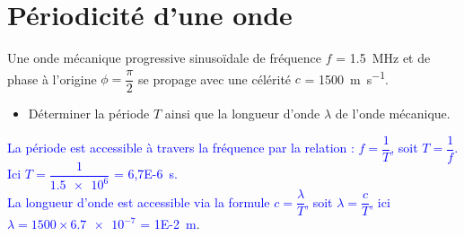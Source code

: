 \documentclass[a4paper,11pt,fleqn]{article}%
\begin{document}
\maketitle

\section{Périodicité d'une onde}
Une onde mécanique progressive sinusoïdale de fréquence $f$ = \SI{1,5}{\mega\hertz} et de phase à l'origine $\phi = \dfrac{\pi}{2}$ se propage avec une célérité $c$ = \SI{1500}{\meter\per\second}.
\begin{itemize}
    \item Déterminer la période $T$ ainsi que la longueur d'onde $\lambda$ de l'onde mécanique.
\end{itemize}
\textcolor{blue}{La période est accessible à travers la fréquence par la relation : $f=\dfrac{1}{T}$, soit $T = \dfrac{1}{f}$. Ici $T = \dfrac{1}{\num{1,5e6}}$ = \SI{6,7E-6}{\second}.\\
La longueur d'onde est accessible via la formule $c=\dfrac{\lambda}{T}$, soit $\lambda = \dfrac{c}{T}$, ici $\lambda = 1500 \times \num{6,7e-7}$ = \SI{1E-2}{\meter}}.\\
\end{document}
